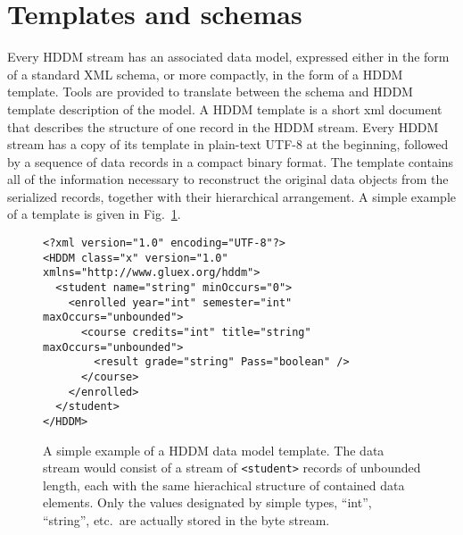 \documentclass{revtex4}
\begin{document}
\section{Templates and schemas}

Every HDDM stream has an associated data model, expressed either in the form of a
standard XML schema, or more compactly, in the form of a HDDM template.  Tools are
provided to translate between the schema and HDDM template description of the model.
A HDDM template is a short xml document that describes the structure of one record
in the HDDM stream. Every HDDM stream has a copy of its template in plain-text
UTF-8 at the beginning, followed by a sequence of data records in a compact binary
format. The template contains all of the information necessary to reconstruct the
original data objects from the serialized records, together with their hierarchical
arrangement. A simple example of a template is given in Fig.~\ref{simple_template}.

\begin{figure}
\begin{minipage}{12cm}
\begin{verbatim}
<?xml version="1.0" encoding="UTF-8"?>
<HDDM class="x" version="1.0" xmlns="http://www.gluex.org/hddm">
  <student name="string" minOccurs="0">
    <enrolled year="int" semester="int" maxOccurs="unbounded">
      <course credits="int" title="string" maxOccurs="unbounded">
        <result grade="string" Pass="boolean" />
      </course>
    </enrolled>
  </student>
</HDDM>
\end{verbatim}
\end{minipage}
\caption{\label{simple_template}
A simple example of a HDDM data model template. The data stream would
consist of a stream of \texttt{<student>} records of unbounded length, each with the
same hierachical structure of contained data elements. Only the values designated
by simple types, ``int'', ``string'', etc.\ are actually stored in the byte stream.}
\end{figure}
\end{document}
